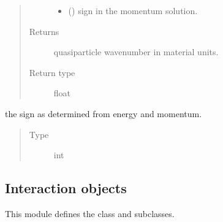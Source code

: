 \documentclass[letterpaper,10pt,english]{sphinxmanual}
\begin{document}
\begin{fulllineitems}
\begin{fulllineitems}
\begin{quote}
\begin{description}
\begin{itemize}
\item {} 
 (\sphinxstyleliteralemphasis{\sphinxupquote{, }}) \textendash{} sign in the momentum solution.

\end{itemize}

\item[{Returns}] \leavevmode
quasiparticle wavenumber in material units.

\item[{Return type}] \leavevmode
float

\end{description}\end{quote}

\end{fulllineitems}


\begin{fulllineitems}
\label{\detokenize{code_structure:scdc.particle.Quasiparticle.ksign}}
the sign as determined from energy and momentum.
\begin{quote}\begin{description}
\item[{Type}] \leavevmode
int

\end{description}\end{quote}

\end{fulllineitems}


\end{fulllineitems}



\subsection{Interaction objects}
\label{\detokenize{code_structure:module-scdc.interaction}}\label{\detokenize{code_structure:interaction-objects}}
This module defines the {\hyperref[\detokenize{code_structure:scdc.interaction.Interaction}]{}} class and subclasses.
\end{document}

